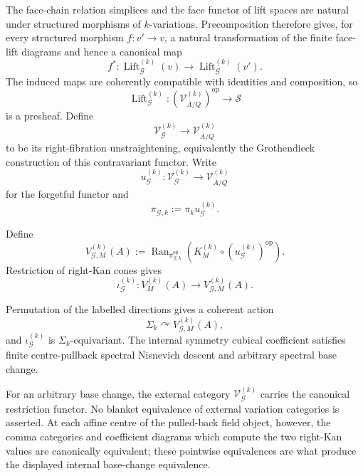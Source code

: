 \begin{definition}
\label{def:symmetry-noether-symmetry-k-variation-category}
The face-chain relation simplices and the face functor of lift spaces are natural
under structured morphisms of $k$-variations.  Precomposition therefore gives,
for every structured morphism $f:v'\to v$, a natural transformation of the
finite face-lift diagrams and hence a canonical map
\[
f^*:
\operatorname{Lift}^{(k)}_{\mathcal G}(v)
\longrightarrow
\operatorname{Lift}^{(k)}_{\mathcal G}(v').
\]
The induced maps are coherently compatible with identities and composition, so
\[
\operatorname{Lift}_{\mathcal G}^{(k)}:
\left(\mathcal V_{\overline A/Q}^{(k)}\right)^{\mathrm{op}}
\longrightarrow
\mathcal S
\]
is a presheaf.  Define
\[
\mathcal V_{\mathcal G}^{(k)}
\longrightarrow
\mathcal V_{\overline A/Q}^{(k)}
\]
to be its right-fibration unstraightening, equivalently the Grothendieck
construction of this contravariant functor.  Write
\[
u_{\mathcal G}^{(k)}:
\mathcal V_{\mathcal G}^{(k)}
\longrightarrow
\mathcal V_{\overline A/Q}^{(k)}
\]
for the forgetful functor and
\[
\pi_{\mathcal G,k}:=\pi_ku_{\mathcal G}^{(k)}.
\]
\end{definition}

\begin{construction}
\label{constr:symmetry-noether-symmetry-cubical-coefficient}
Define
\[
V_{\mathcal G,M}^{(k)}(A)
:=
\operatorname{Ran}_{\pi_{\mathcal G,k}^{\mathrm{op}}}
\left(
K_M^{(k)}
\circ
(u_{\mathcal G}^{(k)})^{\mathrm{op}}
\right).
\]
Restriction of right-Kan cones gives
\[
\iota_{\mathcal G}^{(k)}:
V_M^{(k)}(A)
\longrightarrow
V_{\mathcal G,M}^{(k)}(A).
\]
\end{construction}

\begin{theorem}
\label{thm:symmetry-noether-finite-set-symmetry-descent-and-internal-base-change}
Permutation of the labelled directions gives a coherent action
\[
\Sigma_k\curvearrowright V_{\mathcal G,M}^{(k)}(A),
\]
and $\iota_{\mathcal G}^{(k)}$ is $\Sigma_k$-equivariant.  The internal symmetry
cubical coefficient satisfies finite centre-pullback spectral Nisnevich descent and
arbitrary spectral base change.

For an arbitrary base change, the external category
$\mathcal V_{\mathcal G}^{(k)}$ carries the canonical restriction functor.  No
blanket equivalence of external variation categories is asserted.  At each affine
centre of the pulled-back field object, however, the comma categories and
coefficient diagrams which compute the two right-Kan values are canonically
equivalent; these pointwise equivalences are what produce the displayed internal
base-change equivalence.
\end{theorem}

